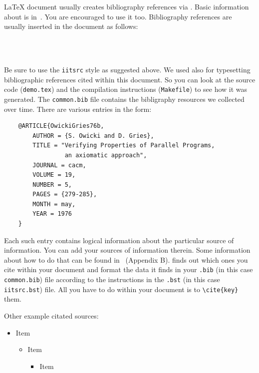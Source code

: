 \documentclass{iitsrc}
\begin{document}
\LaTeX{} document usually creates bibliography references via \BibTeX.
Basic information about \BibTeX{} is in~\cite{lamport:latex}. You are
encouraged to use it too. Bibliography references are usually inserted
in the document as follows:
\begin{verbatim}
   
   
\end{verbatim}
Be sure to use the \verb|iitsrc| style as suggested above. We used \BibTeX{}
also for typesetting bibliographic references cited within this
document. So you can look at the source code ({\tt demo.tex}) and the
compilation instructions ({\tt Makefile}) to see how it was
generated. The {\tt common.bib} file contains the bibligraphy resources
we collected over time. There are various entries in the form:
\begin{verbatim}
    @ARTICLE{OwickiGries76b,
        AUTHOR = {S. Owicki and D. Gries},
        TITLE = "Verifying Properties of Parallel Programs,
                 an axiomatic approach",
        JOURNAL = cacm,
        VOLUME = 19,
        NUMBER = 5,
        PAGES = {279-285},
        MONTH = may,
        YEAR = 1976
    }
\end{verbatim}
Each such entry contains logical information about the particular source
of information. You can add your sources of information therein. Some
information about how to do that can be found in~\cite{lamport:latex}
(Appendix B).  \BibTeX{} finds out which ones you cite within your
document and format the data it finds in your {\tt *.bib} (in this case
{\tt common.bib}) file according to the instructions in the {\tt *.bst}
(in this case {\tt iitsrc.bst}) file. All you have to do within your
document is to \verb|\cite{key}| them.

Other example citated
sources:~\cite{CHS03RR,friedman:switching,henessy:computer,henrio:thesis,MannaPnueli82,MisraChandy,OwickiGries76b,vardhan98distributed,WidomPanangaden,C99-draft,czarnecki:generative-programming,SWIG,leiserson:network}

\begin{itemize}
\item Item
    \begin{itemize}
    \item Item
        \begin{itemize}
        \item Item

        \end{itemize}
    \end{itemize}
\end{itemize}
\end{document}
